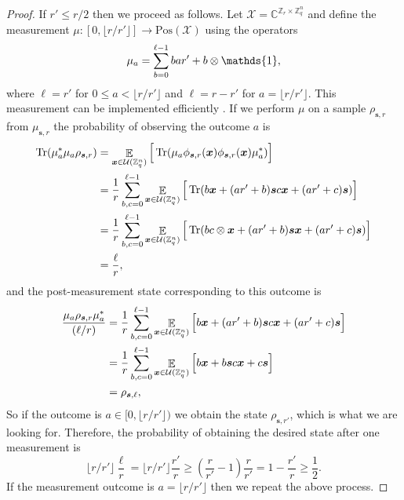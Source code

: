 \documentclass[11pt]{article}
\theoremstyle{plain}
\theoremstyle{definition}
\DeclareMathOperator{\tr}{Tr} %
\DeclareMathOperator{\E}{\mathbb{E}}
\let\ket\relax
\DeclarePairedDelimiter{\ket}{\lvert}{\rangle}
\let\bra\relax
\DeclarePairedDelimiter{\bra}{\langle}{\rvert}
\def\C{\mathbb{C}}
\def\Z{\mathbb{Z}}
\def\X{\mathcal{X}}
\def\U{\mathcal{U}}
\def\PosSemi{\mathrm{Pos}}
\begin{document}
\begin{proof}
    If $r' \le r / 2$ then we proceed as follows. Let $\X = \C^{\Z_r \times \Z_q^n}$ and define the measurement $\mu: [0, \lfloor r / r'  \rfloor] \rightarrow \PosSemi(\X)$ using the operators
    \[ \mu_a = \sum_{b = 0}^{\ell - 1} \ket{b}\bra{ar' + b} \otimes \mathds{1}, \]
    where $\ell = r'$ for $0 \le a < \lfloor r / r'  \rfloor$ and $\ell = r - r'$ for $a = \lfloor r / r'  \rfloor$. This measurement can be implemented efficiently \cite[A.8]{kaye2007introduction}. If we perform $\mu$ on a sample $\rho_{\bm{s}, r}$ from $\mu_{\bm{s}, r}$ the probability of observing the outcome $a$ is
    \begin{align*}
        \tr(\mu_a^*\mu_a \rho_{\bm{s}, r})
        & = \E_{\bm{x} \in \U(\Z_q^n)} \Big[ \tr(\mu_a \ket{\phi_{\bm{s}, r}(\bm{x})} \bra{\phi_{\bm{s}, r}(\bm{x})} \mu_a^*) \Big] \\
        & = \frac{1}{r} \sum_{b, c = 0}^{\ell - 1} \E_{\bm{x} \in \U(\Z_q^n)}\Big[ \tr(\ket{b}\ket{\bm{x} + (ar' + b)\bm{s}} \bra{c}\bra{\bm{x} + (ar' + c)\bm{s}}) \Big] \\
        & = \frac{1}{r} \sum_{b, c = 0}^{\ell - 1} \E_{\bm{x} \in \U(\Z_q^n)}\Big[ \tr(\ket{b}\bra{c} \otimes \ket{\bm{x} + (ar' + b)\bm{s}} \bra{\bm{x} + (ar' + c)\bm{s}}) \Big] \\
        & = \frac{\ell}{r},
    \end{align*}
    and the post-measurement state corresponding to this outcome is
    \begin{align*}
        \frac{\mu_a \rho_{\bm{s}, r} \mu_a^*}{(\ell / r)}
        & = \frac{1}{r} \sum_{b, c = 0}^{\ell - 1} \E_{\bm{x} \in \U(\Z_q^n)}\Big[ \ket{b}\ket{\bm{x} + (ar' + b)\bm{s}} \bra{c}\bra{\bm{x} + (ar' + c)\bm{s}} \Big] \\
        & = \frac{1}{r} \sum_{b, c = 0}^{\ell - 1} \E_{\bm{x} \in \U(\Z_q^n)}\Big[ \ket{b}\ket{\bm{x} + b\bm{s}} \bra{c}\bra{\bm{x} + c\bm{s}} \Big] \\
        & = \rho_{\bm{s}, \ell},
    \end{align*}
    So if the outcome is $a \in [0, \lfloor r / r'  \rfloor)$ we obtain the state $\rho_{\bm{s}, r'}$, which is what we are looking for. Therefore, the probability of obtaining the desired state after one measurement is
    \[ \lfloor r / r' \rfloor \frac{\ell}{r} = \lfloor r / r' \rfloor \frac{r'}{r} \ge \left( \frac{r}{r'} - 1 \right)\frac{r}{r'} = 1 - \frac{r'}{r} \ge \frac{1}{2}. \]
    If the measurement outcome is $a = \lfloor r / r' \rfloor$ then we repeat the above process.
\end{proof}
\end{document}
